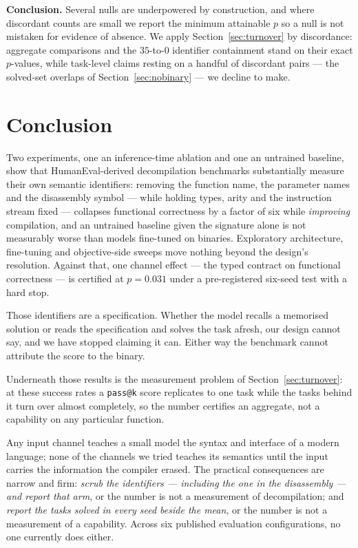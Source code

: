 \documentclass[conference]{IEEEtran}
\makeatletter
\newcommand{\passatk}{\texttt{pass@k}\xspace}
\makeatother
\begin{document}
\textbf{Conclusion.} Several nulls are underpowered by construction, and where
discordant counts are small we report the minimum attainable $p$ so a null is not
mistaken for evidence of absence. We apply Section~\ref{sec:turnover} by
discordance: aggregate comparisons and the $35$-to-$0$ identifier containment
stand on their exact $p$-values, while task-level claims resting on a handful of
discordant pairs --- the solved-set overlaps of Section~\ref{sec:nobinary} --- we
decline to make.

\section{Conclusion}
Two experiments, one an inference-time ablation and one an untrained baseline,
show that HumanEval-derived decompilation benchmarks
substantially measure their own semantic identifiers: removing the function name,
the parameter names and the disassembly symbol --- while holding types, arity and
the instruction stream fixed --- collapses functional correctness by a factor of
six while \emph{improving} compilation, and an untrained baseline given the
signature alone is not measurably worse than models fine-tuned on binaries.
Exploratory architecture, fine-tuning and objective-side sweeps move nothing
beyond the design's resolution. Against that, one channel effect --- the typed
contract on functional correctness --- is certified at $p{=}0.031$ under a
pre-registered six-seed test with a hard stop.

Those identifiers are a specification. Whether the model recalls a memorised
solution or reads the specification and solves the task afresh, our design cannot
say, and we have stopped claiming it can. Either way the benchmark cannot
attribute the score to the binary.

Underneath those results is the measurement problem of Section~\ref{sec:turnover}:
at these success rates a \passatk score replicates to one task while the tasks
behind it turn over almost completely, so the number certifies an aggregate, not
a capability on any particular function.

Any input channel teaches a small model the syntax and interface of a modern
language; none of the channels we tried teaches its semantics until the input
carries the information the compiler erased. The practical consequences are
narrow and firm: \emph{scrub the identifiers --- including the one in the
disassembly --- and report that arm}, or the number is not a measurement of
decompilation; and \emph{report the tasks solved in every seed beside the mean},
or the number is not a measurement of a capability. Across six published
evaluation configurations, no one currently does either.
\end{document}
